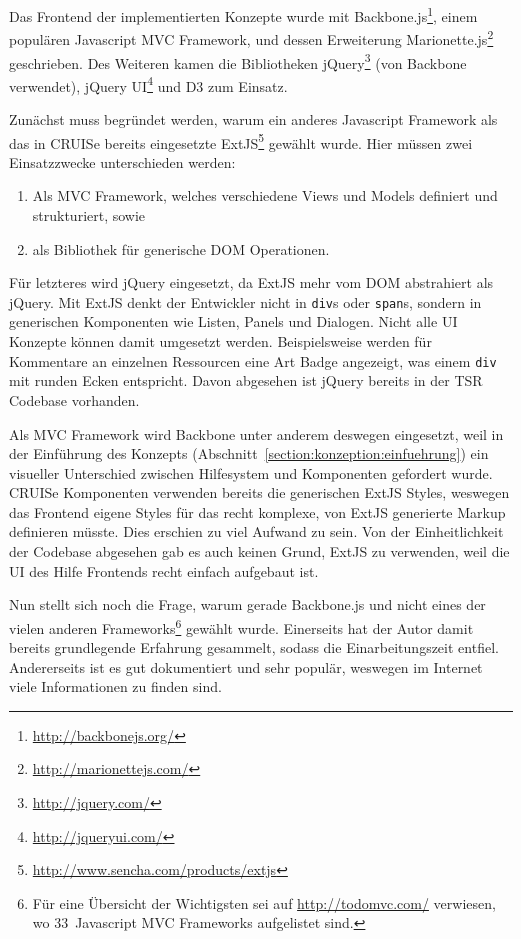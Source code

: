 \documentclass[
	headsepline,
	footsepline,
	fontsize=12pt,
	bibliography=totoc
]{scrbook}
\begin{document}
Das Frontend der implementierten Konzepte wurde mit Backbone.js\footnote{\url{http://backbonejs.org/}}, einem populären Javascript MVC Framework, und dessen Erweiterung Marionette.js\footnote{\url{http://marionettejs.com/}} geschrieben. Des Weiteren kamen die Bibliotheken jQuery\footnote{\url{http://jquery.com/}} (von Backbone verwendet), jQuery UI\footnote{\url{http://jqueryui.com/}} und D3 \cite{Bostock2011} zum Einsatz.

Zunächst muss begründet werden, warum ein anderes Javascript Framework als das in CRUISe bereits eingesetzte ExtJS\footnote{\url{http://www.sencha.com/products/extjs}} gewählt wurde. Hier müssen zwei Einsatzzwecke unterschieden werden:

\begin{enumerate}
	\item Als MVC Framework, welches verschiedene Views und Models definiert und strukturiert, sowie
	\item als Bibliothek für generische DOM Operationen.
\end{enumerate}

Für letzteres wird jQuery eingesetzt, da ExtJS mehr vom DOM abstrahiert als jQuery. Mit ExtJS denkt der Entwickler nicht in \texttt{div}s oder \texttt{span}s, sondern in generischen Komponenten wie Listen, Panels und Dialogen. Nicht alle UI Konzepte können damit umgesetzt werden. Beispielsweise werden für Kommentare an einzelnen Ressourcen eine Art Badge angezeigt, was einem \texttt{div} mit runden Ecken entspricht. Davon abgesehen ist jQuery bereits in der TSR Codebase vorhanden.

Als MVC Framework wird Backbone unter anderem deswegen eingesetzt, weil in der Einführung des Konzepts (Abschnitt~\ref{section:konzeption:einfuehrung}) ein visueller Unterschied zwischen Hilfesystem und Komponenten gefordert wurde. CRUISe Komponenten verwenden bereits die generischen ExtJS Styles, weswegen das Frontend eigene Styles für das recht komplexe, von ExtJS generierte Markup definieren müsste. Dies erschien zu viel Aufwand zu sein. Von der Einheitlichkeit der Codebase abgesehen gab es auch keinen Grund, ExtJS zu verwenden, weil die UI des Hilfe Frontends recht einfach aufgebaut ist.

Nun stellt sich noch die Frage, warum gerade Backbone.js und nicht eines der vielen anderen Frameworks\footnote{Für eine Übersicht der Wichtigsten sei auf \url{http://todomvc.com/} verwiesen, wo 33~Javascript MVC Frameworks aufgelistet sind.} gewählt wurde. Einerseits hat der Autor damit bereits grundlegende Erfahrung gesammelt, sodass die Einarbeitungszeit entfiel. Andererseits ist es gut dokumentiert und sehr populär, weswegen im Internet viele Informationen zu finden sind.
\end{document}
